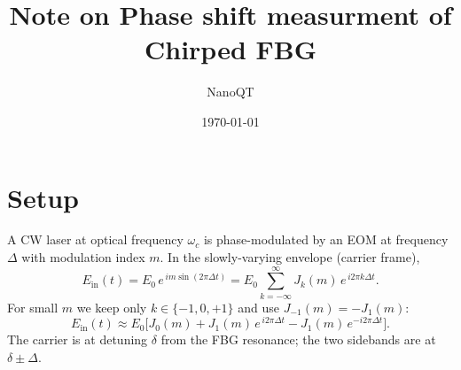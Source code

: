 \documentclass[aps,pra, onecolumn,superscriptaddress,nopacs,floatfix, showkeys, notitlepage]{revtex4-1}
\begin{document}
\title{Note on Phase shift measurment of Chirped FBG}
\author{NanoQT}
\date{\today}

\begin{abstract}
\end{abstract}


\maketitle





%

\section{Setup}

A CW laser at optical frequency $\omega_c$ is phase-modulated by an EOM at
frequency $\Delta$ with modulation index $m$. In the slowly-varying
envelope (carrier frame),
\begin{equation}
    E_{\mathrm{in}}(t) = E_0 \, e^{\,i m \sin(2\pi \Delta t)}
    = E_0 \sum_{k=-\infty}^{\infty} J_k(m)\, e^{\,i 2\pi k \Delta t}.
\end{equation}
For small $m$ we keep only $k \in \{-1,0,+1\}$ and use
$J_{-1}(m) = -J_1(m)$:
\begin{equation}
    E_{\mathrm{in}}(t) \approx E_0\Big[
    J_0(m) + J_1(m)\,e^{\,i 2\pi \Delta t}
    - J_1(m)\,e^{-i 2\pi \Delta t}
    \Big].
\end{equation}
The carrier is at detuning $\delta$ from the FBG resonance; the two
sidebands are at $\delta \pm \Delta$.
\end{document}
